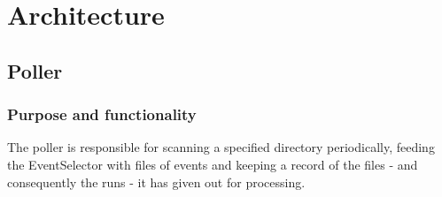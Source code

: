 \section{Architecture}\label{sec:Architecture}

\subsection{\textbf{Poller}}

\subsubsection{\textbf{Purpose and functionality}}
The poller is responsible for scanning a specified directory periodically, feeding the EventSelector with files of events and keeping a record of the files - and consequently the runs - it has given out for processing.

